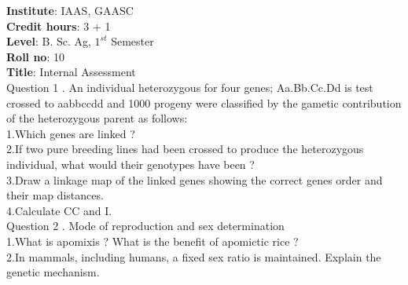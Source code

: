 \documentclass[12pt]{article}\usepackage[]{graphicx}\usepackage[]{color}
\begin{document}
{            \textbf{Institute}: IAAS, GAASC \\}\textbf{Credit hours}: 3 + 1 \\\textbf{Level}: B. Sc. Ag, $1^{st}$ Semester \\\textbf{Roll no}: 10 \\\textbf{Title}: Internal Assessment \\[1cm]Question 1 . An individual heterozygous for four genes; Aa.Bb.Cc.Dd is test crossed to aabbccdd and 1000 progeny were classified by the gametic contribution of the heterozygous parent as follows: \\\hspace{0.5cm}1.Which genes are linked ?\\\hspace{0.5cm}2.If two pure breeding lines had been crossed to produce the heterozygous individual, what would their genotypes have been ?\\\hspace{0.5cm}3.Draw a linkage map of the linked genes showing the correct genes order and their map distances.\\\hspace{0.5cm}4.Calculate CC and I.\\Question 2 . Mode of reproduction and sex determination \\\hspace{0.5cm}1.What is apomixis ? What is the benefit of apomictic rice ?\\\hspace{0.5cm}2.In mammals, including humans, a fixed sex ratio is maintained. Explain the genetic mechanism.\\
\end{document}
